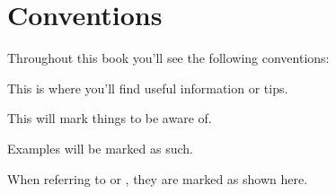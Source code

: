% 

\section{Conventions}

Throughout this book you'll see the following conventions:

\begin{info}
This is where you'll find useful information or tips.
\end{info}

\begin{warning}
This will mark things to be aware of.
\end{warning}

\begin{example}
Examples will be marked as such.
\end{example}

When referring to  or , they are marked as shown here.


